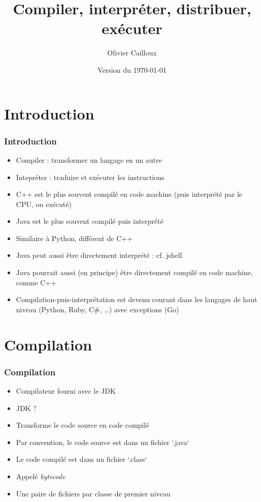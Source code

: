 \documentclass[english, french]{beamer}
\title{Compiler, interpréter, distribuer, exécuter}
\author{Olivier Cailloux}
\institute[LAMSADE]{LAMSADE, Université Paris-Dauphine}
\date{Version du \today}
\begin{document}
\begin{frame}[plain]
	\titlepage
\end{frame}
\addtocounter{framenumber}{-1}

\section{Introduction}
\begin{frame}
	\frametitle{Introduction}
	\begin{itemize}
		\item Compiler : transformer un langage en un autre
		\item Intepréter : traduire et exécuter les instructions
		\item C++ est le plus souvent compilé en code machine (puis interprété par le CPU, ou \og{}exécuté\fg{})
		\item Java est le plus souvent compilé puis interprété
		\item Similaire à Python, différent de C++
		\item Java peut aussi être directement interprété : cf. jshell
		\item Java pourrait aussi (en principe) être directement compilé en code machine, comme C++
		\item Compilation-puis-interprétation est devenu courant dans les langages de haut niveau (Python, Ruby, C\#, …) avec exceptions (Go)
	\end{itemize}
\end{frame}

\section{Compilation}
\begin{frame}
	\frametitle{Compilation}
	\begin{itemize}
		\item Compilateur fourni avec le JDK
		\item JDK ? \onslide<2>{Java Development Kit}
		\item Transforme le code source en code compilé
		\item Par convention, le code source est dans un fichier `.java`
		\item Le code compilé est dans un fichier `.class`
		\item Appelé \emph{bytecode}
		\item Une paire de fichiers par classe {\tiny de premier niveau}
	\end{itemize}
\end{frame}
\end{document}
